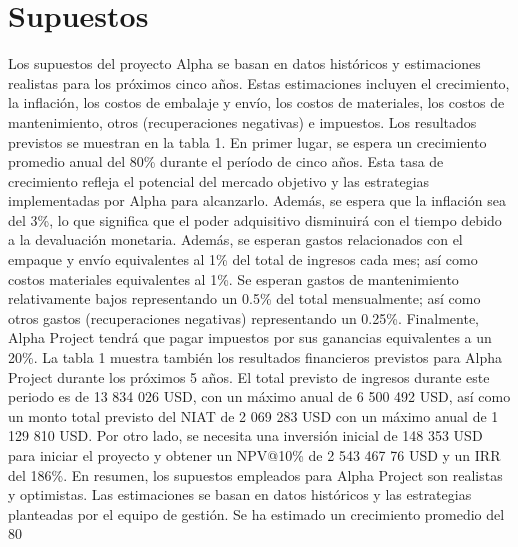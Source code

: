 \section{Supuestos} Los supuestos del proyecto Alpha se basan en datos históricos y estimaciones realistas para los próximos cinco años. Estas estimaciones incluyen el crecimiento, la inflación, los costos de embalaje y envío, los costos de materiales, los costos de mantenimiento, otros (recuperaciones negativas) e impuestos. Los resultados previstos se muestran en la tabla 1.
En primer lugar, se espera un crecimiento promedio anual del 80\% durante el período de cinco años. Esta tasa de crecimiento refleja el potencial del mercado objetivo y las estrategias implementadas por Alpha para alcanzarlo. Además, se espera que la inflación sea del 3\%, lo que significa que el poder adquisitivo disminuirá con el tiempo debido a la devaluación monetaria.
Además, se esperan gastos relacionados con el empaque y envío equivalentes al 1\% del total de ingresos cada mes; así como costos materiales equivalentes al 1\%. Se esperan gastos de mantenimiento relativamente bajos representando un 0.5\% del total mensualmente; así como otros gastos (recuperaciones negativas) representando un 0.25\%. Finalmente, Alpha Project tendrá que pagar impuestos por sus ganancias equivalentes a un 20\%.
La tabla 1 muestra también los resultados financieros previstos para Alpha Project durante los próximos 5 años. El total previsto de ingresos durante este periodo es de 13 834 026 USD, con un máximo anual de 6 500 492 USD, así como un monto total previsto del NIAT de 2 069 283 USD con un máximo anual de 1 129 810 USD. Por otro lado, se necesita una inversión inicial de 148 353 USD para iniciar el proyecto y obtener un NPV@10\% de 2 543 467 76 USD y un IRR del 186\%.
En resumen, los supuestos empleados para Alpha Project son realistas y optimistas. Las estimaciones se basan en datos históricos y las estrategias planteadas por el equipo de gestión. Se ha estimado un crecimiento promedio del 80%
